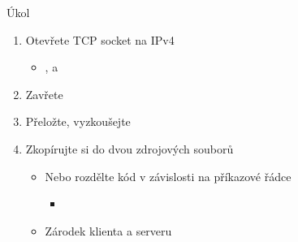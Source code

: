 \begin{frame}{Úkol}

  \begin{enumerate}
    \item Otevřete TCP socket na IPv4
    \begin{itemize}
      \item {},  a 
    \end{itemize}
    \item Zavřete
    \item Přeložte, vyzkoušejte
    \item Zkopírujte si do dvou zdrojových souborů
    \begin{itemize}
      \item Nebo rozdělte kód v závislosti na příkazové řádce
      \begin{itemize}
	\item {}
      \end{itemize}
      \item Zárodek klienta a serveru
    \end{itemize}
  \end{enumerate}

\end{frame}

